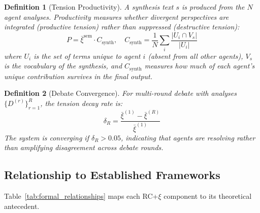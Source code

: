 \documentclass[11pt,a4paper]{article}
\newtheorem{definition}{Definition}[section]
\begin{document}
\begin{definition}[Tension Productivity]
A synthesis text $s$ is produced from the $N$ agent analyses. Productivity measures whether divergent perspectives are \emph{integrated} (productive tension) rather than \emph{suppressed} (destructive tension):
\begin{equation}
  P = \bar{\xi}^{\text{sem}} \cdot C_{\text{synth}}, \quad C_{\text{synth}} = \frac{1}{N}\sum_i \frac{|U_i \cap V_s|}{|U_i|}
  \label{eq:productivity}
\end{equation}
where $U_i$ is the set of terms unique to agent $i$ (absent from all other agents), $V_s$ is the vocabulary of the synthesis, and $C_{\text{synth}}$ measures how much of each agent's unique contribution survives in the final output.
\end{definition}

\begin{definition}[Debate Convergence]
For multi-round debate with analyses $\{D^{(r)}\}_{r=1}^{R}$, the tension decay rate is:
\begin{equation}
  \delta_R = \frac{\bar{\xi}^{(1)} - \bar{\xi}^{(R)}}{\bar{\xi}^{(1)}}
  \label{eq:debate_decay}
\end{equation}
The system is converging if $\delta_R > 0.05$, indicating that agents are resolving rather than amplifying disagreement across debate rounds.
\end{definition}

\subsection{Relationship to Established Frameworks}

Table~\ref{tab:formal_relationships} maps each RC+$\xi$ component to its theoretical antecedent.
\end{document}
